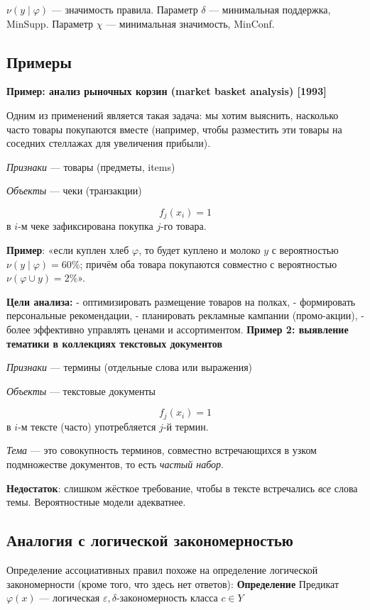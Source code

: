 $\nu(y \mid \varphi)$ — значимость правила.
Параметр $\delta$ — минимальная поддержка, MinSupp.
Параметр $\chi$ — минимальная значимость, MinConf.

\subsection{Примеры}
\textbf{Пример: анализ рыночных корзин (market basket analysis) [1993]}

Одним из применений является такая задача: мы хотим выяснить, насколько часто товары покупаются вместе (например, чтобы разместить эти товары на соседних стеллажах для увеличения прибыли).

\textit{Признаки} — товары (предметы, items)

\textit{Объекты} — чеки (транзакции)

\[ f_j(x_i) = 1 \]
в \( i \)-м чеке зафиксирована покупка \( j \)-го товара.

\textbf{Пример}: «если куплен хлеб \(\varphi\), то будет куплено и молоко \(y\) с вероятностью \(\nu(y \mid \varphi) = 60\%\); причём оба товара покупаются совместно с вероятностью \(\nu(\varphi \cup y) = 2\%\)».

\textbf{Цели анализа:}
- оптимизировать размещение товаров на полках,
- формировать персональные рекомендации,
- планировать рекламные кампании (промо-акции),
- более эффективно управлять ценами и ассортиментом.
\newline
\newline
\textbf{Пример 2: выявление тематики в коллекциях текстовых документов}

\textit{Признаки} — термины (отдельные слова или выражения)

\textit{Объекты} — текстовые документы

\[ f_j(x_i) = 1 \]
в \( i \)-м тексте (часто) употребляется \( j \)-й термин.

\textit{Тема} — это совокупность терминов, совместно встречающихся в узком подмножестве документов, то есть \textit{частый набор}.

\textbf{Недостаток}: слишком жёсткое требование, чтобы в тексте встречались \textit{все} слова темы. Вероятностные модели адекватнее.

\subsection{Аналогия с логической закономерностью}
Определение ассоциативных правил похоже на определение логической закономерности (кроме того, что здесь нет ответов):
\newline
\textbf{Определение}
\newline
Предикат \(\varphi(x)\) — логическая \(\varepsilon, \delta\)-закономерность класса \(c \in Y\)

